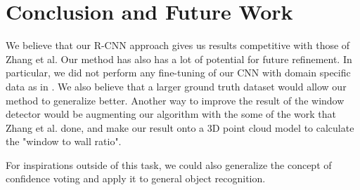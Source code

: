 \documentclass[10pt,twocolumn,letterpaper]{article}
\begin{document}
\section{Conclusion and Future Work}

We believe that our R-CNN approach gives us results competitive with those of Zhang et al. Our method has also has a lot of potential for future refinement. In particular, we did not perform any fine-tuning of our CNN with domain specific data as in \cite{girshick}. We also believe that a larger ground truth dataset would allow our method to generalize better. Another way to improve the result of the window detector would be augmenting our algorithm with the some of the work that Zhang et al. done, and make our result onto a 3D point cloud model to calculate the "window to wall ratio".


For inspirations outside of this task, we could also generalize the concept of confidence voting and apply it to general object recognition.


{\small


}
\end{document}
